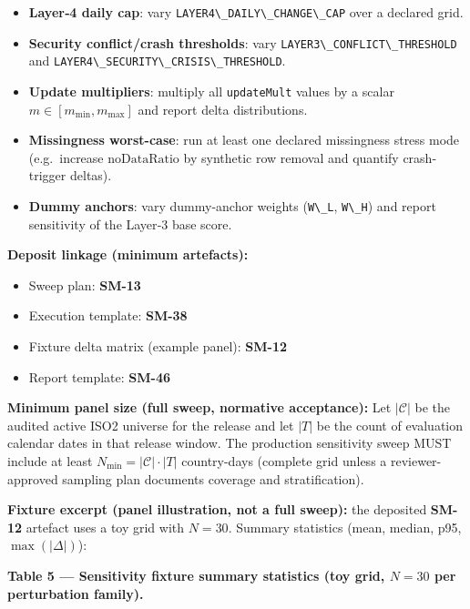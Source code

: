 \documentclass[
  11pt,
  peerreview,journal,onecolumn]{IEEEtran}
\newcommand{\passthrough}[1]{#1}
\providecommand{\tightlist}{%
  \setlength{\itemsep}{0pt}\setlength{\parskip}{0pt}}
\begin{document}
\begin{itemize}
\tightlist
\item
  \textbf{Layer‑4 daily cap}: vary
  \passthrough{\lstinline!LAYER4\_DAILY\_CHANGE\_CAP!} over a declared
  grid.
\item
  \textbf{Security conflict/crash thresholds}: vary
  \passthrough{\lstinline!LAYER3\_CONFLICT\_THRESHOLD!} and
  \passthrough{\lstinline!LAYER4\_SECURITY\_CRISIS\_THRESHOLD!}.
\item
  \textbf{Update multipliers}: multiply all
  \passthrough{\lstinline!updateMult!} values by a scalar
  \(m \in [m_{\min}, m_{\max}]\) and report delta distributions.
\item
  \textbf{Missingness worst-case}: run at least one declared missingness
  stress mode (e.g.~increase \(\mathrm{noDataRatio}\) by synthetic row
  removal and quantify crash-trigger deltas).
\item
  \textbf{Dummy anchors}: vary dummy-anchor weights
  (\passthrough{\lstinline!W\_L!}, \passthrough{\lstinline!W\_H!}) and
  report sensitivity of the Layer‑3 base score.
\end{itemize}

\textbf{Deposit linkage (minimum artefacts):}

\begin{itemize}
\tightlist
\item
  Sweep plan: \textbf{SM-13}
\item
  Execution template: \textbf{SM-38}
\item
  Fixture delta matrix (example panel): \textbf{SM-12}
\item
  Report template: \textbf{SM-46}
\end{itemize}

\textbf{Minimum panel size (full sweep, normative acceptance):} Let
\(|\mathcal{C}|\) be the audited active ISO2 universe for the release
and let \(|T|\) be the count of evaluation calendar dates in that
release window. The production sensitivity sweep MUST include at least
\(N_{\min}=|\mathcal{C}|\cdot|T|\) country-days (complete grid unless a
reviewer-approved sampling plan documents coverage and stratification).

\textbf{Fixture excerpt (panel illustration, not a full sweep):} the
deposited \textbf{SM-12} artefact uses a toy grid with \(N=30\). Summary
statistics (mean, median, p95, \(\max(|\Delta|)\)):

\textbf{Table 5 --- Sensitivity fixture summary statistics (toy grid,
\(N=30\) per perturbation family).}
\end{document}
